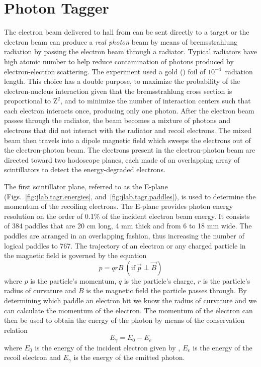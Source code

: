 \section{Photon Tagger} \label{sec:clas.tagr}

The electron beam delivered to hall  from  can be sent directly to a target or the electron beam can produce a \emph{real photon} beam by means of bremsstrahlung radiation by passing the electron beam through a radiator. Typical radiators have high atomic number to help reduce contamination of photons produced by electron-electron scattering. The  experiment used a gold () foil of $10^{-4}$~radiation length. This choice has a double purpose, to maximize the probability of the electron-nucleus interaction given that the bremsstrahlung cross section is proportional to $\mathrm{Z^{2}}$, and to minimize the number of interaction centers such that each electron interacts once, producing only one photon. After the electron beam passes through the radiator, the beam becomes a mixture of photons and electrons that did not interact with the radiator and recoil electrons. The mixed beam then travels into a dipole magnetic field which sweeps the electrons out of the electron-photon beam. The electrons present in the electron-photon beam are directed toward two hodoscope planes, each made of an overlapping array of scintillators to detect the energy-degraded electrons.

%  

The first scintillator plane, referred to as the E-plane (Figs.~\ref{fig:jlab.tagr.energies}, and~\ref{fig:jlab.tagr.paddles}), is used to determine the momentum of the recoiling electrons. The E-plane provides photon energy resolution on the order of 0.1\% of the incident electron beam energy. It consists of 384 paddles that are 20 cm long, 4 mm thick and from 6 to 18 mm wide. The paddles are arranged in an overlapping fashion, thus increasing the number of logical paddles to 767.
The trajectory of an electron or any charged particle in the magnetic field is governed by the equation
\begin{equation}\label{eq:motioninmag}
	p = qrB \ (\mathrm{if}\ \vec{p} \perp \vec{B} )
\end{equation}
where $p$ is the particle's momentum, $q$ is the particle's charge, $r$ is the particle's radius of curvature and $B$ is the magnetic field the particle passes through.
By determining which paddle an electron hit we know the radius of curvature and we can calculate the momentum of the electron. The momentum of the electron can then be used to obtain the energy of the photon by means of the conservation relation 
\begin{equation}\label{eq:tagger.energy}
	E_{\gamma} = E_{0} - E_{e}
\end{equation}
where $E_{0}$ is the energy of the incident electron given by , $E_{e}$ is the energy of the recoil electron and $E_{\gamma}$ is the energy of the emitted photon. 

